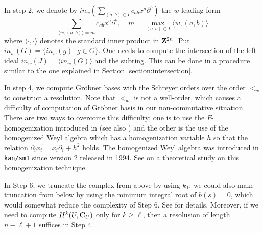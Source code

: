 \documentclass[12pt]{article}
\def\pd#1{ \partial_{#1} }
\def\C{{\bf C}}
\def\Z{ {\bf Z} }
\def\comment#1{  }
\begin{document}
In step 2, we denote by
$ in_w(\sum_{(a,b) \in I} c_{ab} x^a \pd{}^b ) $
the $w$-leading form %
$$ \sum_{ \langle w, (a,b) \rangle = m} c_{ab} x^a \pd{}^b, \quad
   m = \max_{ (a,b) \in I} \langle w, (a,b) \rangle
$$
where $\langle \cdot, \cdot \rangle$ denotes the standard inner product
in $\Z^{2n}$.
Put $in_w(G) = \{ in_w(g) \,|\, g \in G \}$.
One needs to compute the intersection of the left ideal
$in_w(J) = \langle in_w(G) \rangle $
and the subring.  This can be done in a procedure similar to the one explained
in Section \ref{section:intersection}.

In step 4, we compute Gr\"obner bases with the Schreyer orders over
the order $<_w$ to construct a resolution.
Note that $<_w$ is not a well-order, which causes a difficulty of computation
of Gr\"obner basis in our non-commutative situation.
There are two ways to overcome this difficulty;
one is to use the $F$-homogenization introduced in \cite{OakuJMS} (see also
\cite[Section 3]{OakuBfunction}) and the other is the use of
the homogenized Weyl algebra which has a homogenization variable $h$ so that
the relation $\pd{i} x_i = x_i \pd{i}+h^2$ holds.
The homogenized Weyl algebra was introduced in {\tt kan/sm1} 
\cite{Kan-sm1} since version 2 released in 1994.
See \cite{ACG} on a theoretical study on this homogenization technique.


In Step 6, we truncate the complex from above by using $k_1$; 
we could also make truncation from below by using the minimum integral 
root of $b(s)=0$, which would somewhat reduce the complexity of Step 6.  
See \cite{OakuAdvance2} for details.
Moreover, if we need to compute $H^k(U,\C_U)$ only for $k \geq \ell$, 
then a resolusion of length $n-\ell+1$ suffices in Step 4.  
\end{document}
